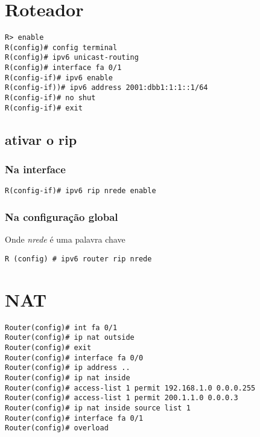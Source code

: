 \documentclass[]{article}
\begin{document}
\hypertarget{roteador}{%
\section{Roteador}\label{roteador}}

\begin{verbatim}
R> enable
R(config)# config terminal
R(config)# ipv6 unicast-routing 
R(config)# interface fa 0/1
R(config-if)# ipv6 enable
R(config-if))# ipv6 address 2001:dbb1:1:1::1/64
R(config-if)# no shut
R(config-if)# exit
\end{verbatim}

\hypertarget{ativar-o-rip}{%
\subsection{ativar o rip}\label{ativar-o-rip}}

\hypertarget{na-interface}{%
\subsubsection{Na interface}\label{na-interface}}

\begin{verbatim}
R(config-if)# ipv6 rip nrede enable
\end{verbatim}

\hypertarget{na-configurauxe7uxe3o-global}{%
\subsubsection{Na configuração
global}\label{na-configurauxe7uxe3o-global}}

Onde \emph{nrede} é uma palavra chave

\begin{verbatim}
R (config) # ipv6 router rip nrede
\end{verbatim}

\hypertarget{nat}{%
\section{NAT}\label{nat}}

\begin{verbatim}
Router(config)# int fa 0/1
Router(config)# ip nat outside
Router(config)# exit 
Router(config)# interface fa 0/0
Router(config)# ip address ..
Router(config)# ip nat inside 
Router(config)# access-list 1 permit 192.168.1.0 0.0.0.255
Router(config)# access-list 1 permit 200.1.1.0 0.0.0.3
Router(config)# ip nat inside source list 1
Router(config)# interface fa 0/1
Router(config)# overload
\end{verbatim}
\end{document}
